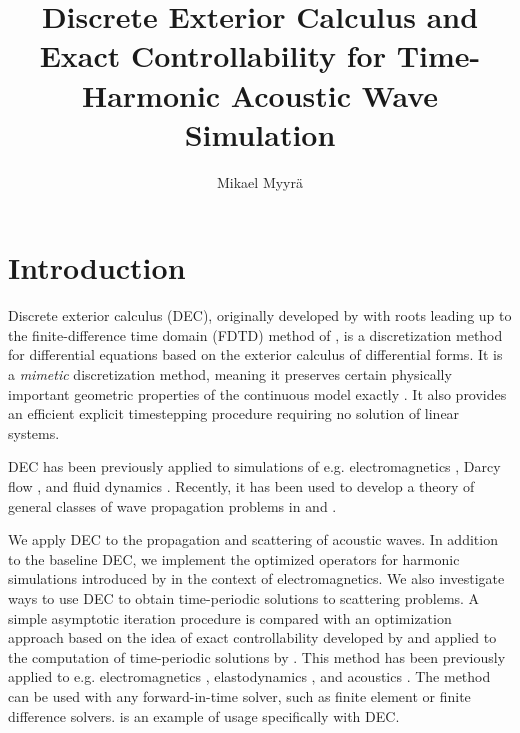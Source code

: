 \documentclass[utf8,english]{gradu3}
\title{Discrete Exterior Calculus and Exact Controllability for Time-Harmonic Acoustic Wave Simulation}
\author{Mikael Myyrä}
\begin{document}
\hfuzz=1.5pt
\maketitle
\mainmatter
\hfuzz=0pt


\chapter{Introduction}

Discrete exterior calculus (DEC),
originally developed by \textcite{desbrun_discrete_2005}
with roots leading up to the finite-difference time domain (FDTD)
method of \textcite{yee_numerical_1966},
is a discretization method for differential equations
based on the exterior calculus of differential forms.
It is a \textit{mimetic} discretization method,
meaning it preserves certain physically important geometric properties
of the continuous model exactly \parencite{bochev_principles_2006}.
It also provides an efficient explicit timestepping procedure
requiring no solution of linear systems.

DEC has been previously applied to simulations of e.g. electromagnetics
\parencite{rabina_efficient_2015, monkola_discrete_2022},
Darcy flow \parencite{hirani_numerical_2015},
and fluid dynamics \parencite{nitschke_discrete_2017}.
Recently, it has been used to develop a theory 
of general classes of wave propagation problems
in \parencite{rabina_generalized_2018} and \parencite{rossi_systematisation_2021}.

We apply DEC to the propagation and scattering of acoustic waves.
In addition to the baseline DEC, we implement the optimized operators
for harmonic simulations introduced by \textcite{rabina_numerical_2014}
in the context of electromagnetics.
We also investigate ways to use DEC to obtain time-periodic solutions to scattering problems.
A simple asymptotic iteration procedure is compared with an optimization approach
based on the idea of exact controllability developed by \textcite{lions_exact_1988}
and applied to the computation of time-periodic solutions by
\textcite{bristeau_controllability_1998}.
This method has been previously applied to e.g.
electromagnetics \parencite{rabina_numerical_2014},
elastodynamics \parencite{monkola_time-harmonic_2008},
and acoustics \parencite{kahkonen_solution_2011}.
The method can be used with any forward-in-time solver,
such as finite element or finite difference solvers.
\parencite{rabina_numerical_2014} is an example of usage specifically with DEC.
\end{document}
